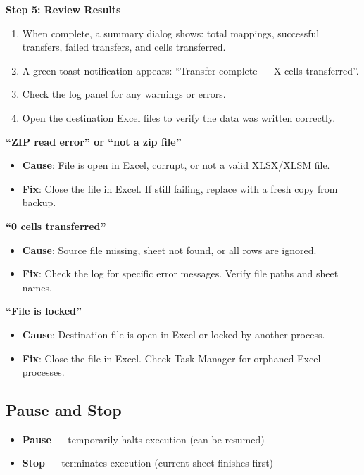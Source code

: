 \documentclass[11pt,a4paper]{article}
\begin{document}
\begin{stepbox}
\textbf{Step 5: Review Results}
\begin{enumerate}[leftmargin=*, itemsep=4pt]
\item When complete, a summary dialog shows: total mappings, successful transfers, failed transfers, and cells transferred.
\item A green toast notification appears: ``Transfer complete --- X cells transferred''.
\item Check the log panel for any warnings or errors.
\item Open the destination Excel files to verify the data was written correctly.
\end{enumerate}
\end{stepbox}

\begin{warningbox}
\textbf{``ZIP read error'' or ``not a zip file''}
\begin{itemize}[leftmargin=*, itemsep=2pt]
\item \textbf{Cause}: File is open in Excel, corrupt, or not a valid XLSX/XLSM file.
\item \textbf{Fix}: Close the file in Excel. If still failing, replace with a fresh copy from backup.
\end{itemize}

\textbf{``0 cells transferred''}
\begin{itemize}[leftmargin=*, itemsep=2pt]
\item \textbf{Cause}: Source file missing, sheet not found, or all rows are ignored.
\item \textbf{Fix}: Check the log for specific error messages. Verify file paths and sheet names.
\end{itemize}

\textbf{``File is locked''}
\begin{itemize}[leftmargin=*, itemsep=2pt]
\item \textbf{Cause}: Destination file is open in Excel or locked by another process.
\item \textbf{Fix}: Close the file in Excel. Check Task Manager for orphaned Excel processes.
\end{itemize}
\end{warningbox}

\subsection{Pause and Stop}

\begin{itemize}[leftmargin=*, itemsep=4pt]
\item \textbf{Pause} --- temporarily halts execution (can be resumed)
\item \textbf{Stop} --- terminates execution (current sheet finishes first)
\end{itemize}
\end{document}
